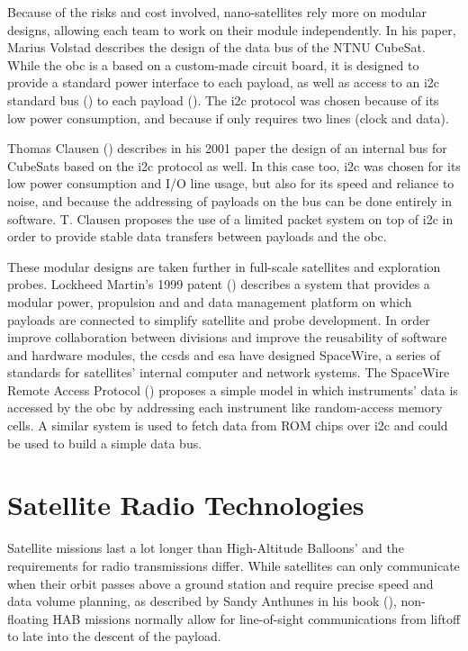 Because of the risks and cost involved, nano-satellites rely more on modular designs, allowing each team to work on their module independently. In his paper, Marius Volstad describes the design of the data bus of the NTNU CubeSat. While the \acrlong{obc} is a based on a custom-made circuit board, it is designed to provide a standard power interface to each payload, as well as access to an \acrshort{i2c} standard bus (\cite{NXPSemiconductors2014}) to each payload (\cite{Volstad2011}). The \acrshort{i2c} protocol was chosen because of its low power consumption, and because if only requires two lines (clock and data).

Thomas Clausen (\cite{Clausen2001}) describes in his 2001 paper the design of an internal bus for CubeSats based on the \acrshort{i2c} protocol as well. In this case too, \acrshort{i2c} was chosen for its low power consumption and I/O line usage, but also for its speed and reliance to noise, and because the addressing of payloads on the bus can be done entirely in software. T. Clausen proposes the use of a limited packet system on top of \acrshort{i2c} in order to provide stable data transfers between payloads and the \acrlong{obc}.

These modular designs are taken further in full-scale satellites and exploration probes. Lockheed Martin's 1999 patent (\cite{Benedetti1999}) describes a system that provides a modular power, propulsion and and data management platform on which payloads are connected to simplify satellite and probe development. In order improve collaboration between divisions and improve the reusability of software and hardware modules, the \acrfull{ccsds} and \acrfull{esa} have designed SpaceWire, a series of standards for satellites' internal computer and network systems. The SpaceWire Remote Access Protocol (\cite{parkes2005}) proposes a simple model in which instruments' data is accessed by the \acrlong{obc} by addressing each instrument like random-access memory cells. A similar system is used to fetch data from ROM chips over \acrshort{i2c} and could be used to build a simple data bus.

\section{Satellite Radio Technologies}

Satellite missions last a lot longer than High-Altitude Balloons' and the requirements for radio transmissions differ. While satellites can only communicate when their orbit passes above a ground station and require precise speed and data volume planning, as described by Sandy Anthunes in his book (\cite{Antunes2015}), non-floating HAB missions normally allow for line-of-sight communications from liftoff to late into the descent of the payload.

